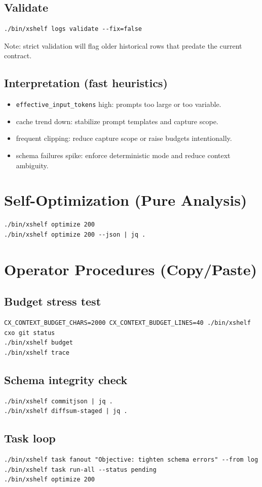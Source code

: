 \documentclass[11pt]{article}
\begin{document}
\subsection{Validate}
\begin{lstlisting}[style=cx]
./bin/xshelf logs validate --fix=false
\end{lstlisting}
Note: strict validation will flag older historical rows that predate the current contract.

\subsection{Interpretation (fast heuristics)}
\begin{itemize}
  \item \texttt{effective\_input\_tokens} high: prompts too large or too variable.
  \item cache trend down: stabilize prompt templates and capture scope.
  \item frequent clipping: reduce capture scope or raise budgets intentionally.
  \item schema failures spike: enforce deterministic mode and reduce context ambiguity.
\end{itemize}

\section{Self-Optimization (Pure Analysis)}
\begin{lstlisting}[style=cx]
./bin/xshelf optimize 200
./bin/xshelf optimize 200 --json | jq .
\end{lstlisting}

\section{Operator Procedures (Copy/Paste)}
\subsection*{Budget stress test}
\begin{lstlisting}[style=cx]
CX_CONTEXT_BUDGET_CHARS=2000 CX_CONTEXT_BUDGET_LINES=40 ./bin/xshelf cxo git status
./bin/xshelf budget
./bin/xshelf trace
\end{lstlisting}

\subsection*{Schema integrity check}
\begin{lstlisting}[style=cx]
./bin/xshelf commitjson | jq .
./bin/xshelf diffsum-staged | jq .
\end{lstlisting}

\subsection*{Task loop}
\begin{lstlisting}[style=cx]
./bin/xshelf task fanout "Objective: tighten schema errors" --from log
./bin/xshelf task run-all --status pending
./bin/xshelf optimize 200
\end{lstlisting}
\end{document}
